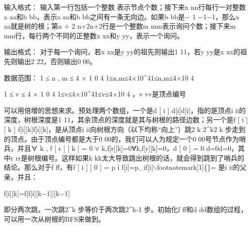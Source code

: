 \documentclass[9pt, b5paaper]{book}
\begin{document}
输入格式：
输入第一行包括一个整数 表示节点个数；接下来n nn行每行一对整数a aa和b bb，表示a aa和b bb之间有一条无向边。如果b bb是− 1 −1−1，那么a aa就是树的根；第n + 2 n+2n+2行是一个整数m mm表示询问个数；接下来m mm行，每行两个不同的正整数x xx和y yy，表示一个询问。

输出格式：
对于每一个询问，若x xx是y yy的祖先则输出1 11，若y yy是x xx的祖先则输出2 22，否则输出0 00。

数据范围：
1 ≤ n , m ≤ 4 × 1 0 4 1≤n,m≤4×10\^{}41≤n,m≤4×10 
4

1 ≤ v ≤ 4 × 1 0 4 1≤v≤4×10\^{}41≤v≤4×10 
4
 ，v vv是顶点编号

可以用倍增的思想来求。预处理两个数组，一个是d [ i ] d[i]d[i]，指的是顶点i ii的深度，树根深度是1 11，其余顶点的深度就是其与树根的路径边数；另一个是f [ i ] [ k ] f[i][k]f[i][k]，是从顶点i ii向树根方向（以下均称“向上”）跳2 k 2\^{}k2 
k
 步走到的顶点。由于顶点编号都是大于0 00的，我们可以人为规定一个0 00号节点作为哨兵，并且∀ k , f [ r ] [ k ] = 0 $\forall$ k,f[r][k]=0∀k,f[r][k]=0，d [ 0 ] = 0 d\footnotemark[1]{}=0d\footnotemark[1]{}=0，其中r rr是树根编号。这样如果k kk太大导致跳出树根的话，就会得到跳到了哨兵的结论。那么对于f ff，有f [ i ] [ 0 ] = p i f[i]\footnotemark[1]{}=p\_if[i]$\backslash$footnotemark[1]\{\}= 是i ii的父亲，并且：

f[i][k]=f[f[i][k−1]][k−1]

即分两次跳，一次跳2\^{}k 步等价于两次跳2\^{}k-1 步。初始化f ff和d dd数组的过程，可以用一次从树根的BFS来做到。
\end{document}
